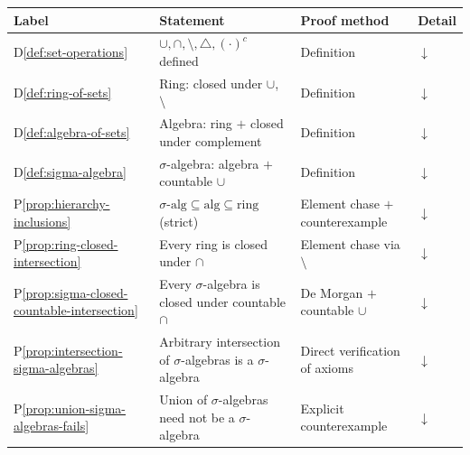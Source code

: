
\begin{tcolorbox}[colback=gray!6, colframe=gray!40, arc=2pt,
  left=6pt, right=6pt, top=4pt, bottom=4pt,
  title={\small\textbf{Section Toolkit --- Quick Reference}},
  fonttitle=\small\bfseries]
\small
\begin{tabular}{l l l l}
\toprule
\textbf{Label} & \textbf{Statement} & \textbf{Proof method} & \textbf{Detail} \\
\midrule
D\ref{def:set-operations}
  & $\cup,\cap,\setminus,\triangle,(\cdot)^c$ defined
  & Definition & \hyperref[def:set-operations]{$\downarrow$} \\
D\ref{def:ring-of-sets}
  & Ring: closed under $\cup$, $\setminus$
  & Definition & \hyperref[def:ring-of-sets]{$\downarrow$} \\
D\ref{def:algebra-of-sets}
  & Algebra: ring $+$ closed under complement
  & Definition & \hyperref[def:algebra-of-sets]{$\downarrow$} \\
D\ref{def:sigma-algebra}
  & $\sigma$-algebra: algebra $+$ countable $\cup$
  & Definition & \hyperref[def:sigma-algebra]{$\downarrow$} \\
P\ref{prop:hierarchy-inclusions}
  & $\sigma\text{-alg} \subseteq \text{alg} \subseteq \text{ring}$
    (strict)
  & Element chase $+$ counterexample
  & \hyperref[prf:hierarchy-inclusions]{$\downarrow$} \\
P\ref{prop:ring-closed-intersection}
  & Every ring is closed under $\cap$
  & Element chase via $\setminus$
  & \hyperref[prf:ring-closed-intersection]{$\downarrow$} \\
P\ref{prop:sigma-closed-countable-intersection}
  & Every $\sigma$-algebra is closed under countable $\cap$
  & De Morgan $+$ countable $\cup$
  & \hyperref[prf:sigma-closed-countable-intersection]{$\downarrow$} \\
P\ref{prop:intersection-sigma-algebras}
  & Arbitrary intersection of $\sigma$-algebras is a $\sigma$-algebra
  & Direct verification of axioms
  & \hyperref[prf:intersection-sigma-algebras]{$\downarrow$} \\
P\ref{prop:union-sigma-algebras-fails}
  & Union of $\sigma$-algebras need not be a $\sigma$-algebra
  & Explicit counterexample
  & \hyperref[prf:union-sigma-algebras-fails]{$\downarrow$} \\
\bottomrule
\end{tabular}
\end{tcolorbox}

